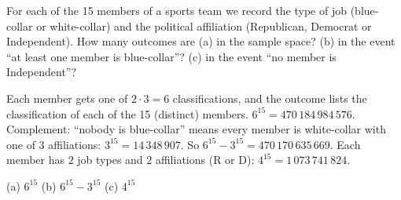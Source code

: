 
\begin{problem}
	For each of the 15 members of a sports team we record the type of job
	(blue-collar or white-collar) and the political affiliation (Republican,
	Democrat or Independent). How many outcomes are (a) in the sample space?
	(b) in the event ``at least one member is blue-collar''? (c) in the event
	``no member is Independent''?
\end{problem}

\begin{solution}
	\idea Each member gets one of $2\cdot3=6$ classifications, and the outcome
	lists the classification of each of the 15 (distinct) members.
	 $6^{15}=470\,184\,984\,576$.
	 Complement: ``nobody is blue-collar'' means every member is
	white-collar with one of 3 affiliations: $3^{15}=14\,348\,907$. So
	$6^{15}-3^{15}=470\,170\,635\,669$.
	 Each member has $2$ job types and $2$ affiliations (R or D):
	$4^{15}=1\,073\,741\,824$.
	\begin{answer}
		(a) $6^{15}$ \quad (b) $6^{15}-3^{15}$ \quad (c) $4^{15}$
	\end{answer}
\end{solution}
